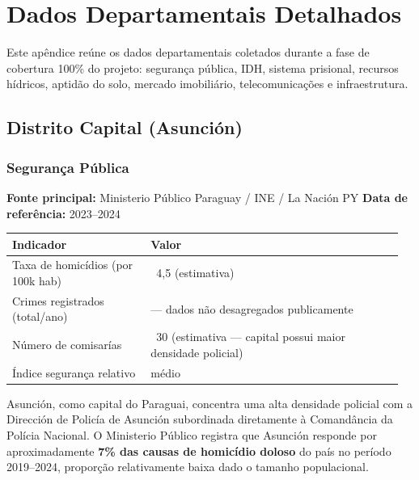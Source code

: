 
\chapter{Dados Departamentais Detalhados}
\label{chap:dados_departamentais}

Este apêndice reúne os dados departamentais coletados durante a fase de cobertura 100\% do projeto: segurança pública, IDH, sistema prisional, recursos hídricos, aptidão do solo, mercado imobiliário, telecomunicações e infraestrutura.


\clearpage
\section{Distrito Capital (Asunción)}
\label{sec:dept_00_Distrito_Capital}

\subsection{Segurança Pública}

\textbf{Fonte principal:} Ministerio Público Paraguay / INE / La Nación PY
\textbf{Data de referência:} 2023--2024


{\small
\setlength{\tabcolsep}{3pt}
\renewcommand{\arraystretch}{1.12}
\begin{tabularx}{\linewidth}{>{\raggedright\arraybackslash}p{0.34\linewidth} >{\raggedright\arraybackslash}p{0.62\linewidth}}
\toprule
Indicador & Valor \\
\midrule
Taxa de homicídios (por 100k hab) & ~4,5 (estimativa) \\
Crimes registrados (total/ano) & --- dados não desagregados publicamente \\
Número de comisarías & ~30 (estimativa --- capital possui maior densidade policial) \\
Índice segurança relativo & médio \\
\bottomrule
\end{tabularx}
}


Asunción, como capital do Paraguai, concentra uma alta densidade policial com a Dirección de Policía de Asunción subordinada diretamente à Comandância da Polícia Nacional. O Ministerio Público registra que Asunción responde por aproximadamente \textbf{7\% das causas de homicídio doloso} do país no período 2019--2024, proporção relativamente baixa dado o tamanho populacional.

